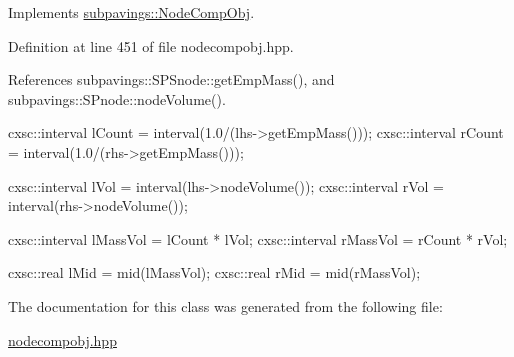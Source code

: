 \-Implements \hyperlink{classsubpavings_1_1NodeCompObj_a121d53049c5ed1c0924313951d6aa630}{subpavings\-::\-Node\-Comp\-Obj}.



\-Definition at line 451 of file nodecompobj.\-hpp.



\-References subpavings\-::\-S\-P\-Snode\-::get\-Emp\-Mass(), and subpavings\-::\-S\-Pnode\-::node\-Volume().


\begin{DoxyCode}
      {   
        cxsc::interval lCount = interval(1.0/(lhs->getEmpMass()));
        cxsc::interval rCount = interval(1.0/(rhs->getEmpMass()));
        
        cxsc::interval lVol = interval(lhs->nodeVolume());
        cxsc::interval rVol = interval(rhs->nodeVolume());
        
        cxsc::interval lMassVol = lCount * lVol;
        cxsc::interval rMassVol = rCount * rVol;
       
        cxsc::real lMid = mid(lMassVol);
        cxsc::real rMid = mid(rMassVol);
    }
\end{DoxyCode}


\-The documentation for this class was generated from the following file\-:\begin{DoxyCompactItemize}
\item 
\hyperlink{nodecompobj_8hpp}{nodecompobj.\-hpp}\end{DoxyCompactItemize}
